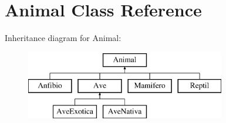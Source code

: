 \hypertarget{classAnimal}{}\section{Animal Class Reference}
\label{classAnimal}
Inheritance diagram for Animal\+:\begin{figure}[H]
\begin{center}
\leavevmode
\includegraphics[height=3.000000cm]{classAnimal}
\end{center}
\end{figure}
